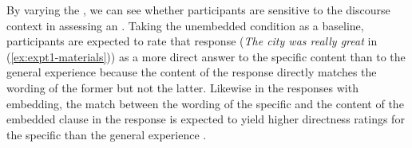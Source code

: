 \documentclass[output=paper]{langsci/langscibook}
\begin{document}


By varying the , we can see whether participants are sensitive to the discourse context in assessing an . Taking the unembedded condition as a baseline, participants are expected to rate that response ({\itshape The city was really great} in (\ref{ex:expt1-materials})) as a more direct answer to the specific content  than to the general experience  because the content of the response directly matches the wording of the former  but not the latter. Likewise in the responses with embedding, the match between the wording of the specific  and the content of the embedded clause in the response is expected to yield higher directness ratings for the specific  than the general experience .  
\end{document}
